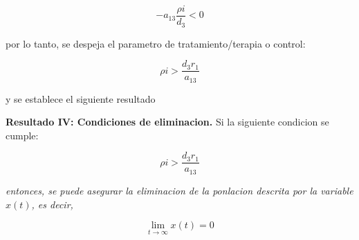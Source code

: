 \documentclass[letterpaper,11pt]{article}
\begin{document}
\bigskip

\begin{equation*}
-a_{13}\frac{\rho i}{d_{3}}<0
\end{equation*}

\bigskip

por lo tanto, se despeja el parametro de tratamiento/terapia o control:

\bigskip

\begin{equation*}
\rho i>\frac{d_{3}r_{1}}{a_{13}}
\end{equation*}

\bigskip

y se establece el siguiente resultado

\bigskip

\textbf{Resultado IV: Condiciones de eliminacion.} Si la siguiente condicion
se cumple:

\bigskip

\begin{equation*}
\rho i>\frac{d_{3}r_{1}}{a_{13}}
\end{equation*}

\bigskip

\textit{entonces, se puede asegurar la eliminacion de la ponlacion descrita
por la variable }$x\left( t\right) $\textit{, es decir,}

\bigskip

\begin{equation*}
\lim_{t\rightarrow \infty }x\left( t\right) =0
\end{equation*}
\end{document}

